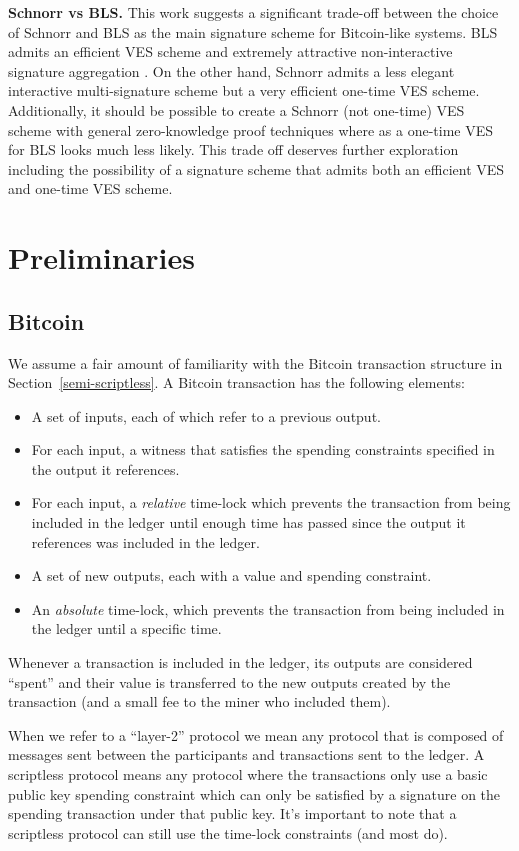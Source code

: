 \documentclass[fullpage]{article}
\theoremstyle{definition}
\begin{document}
\hfill \break \textbf{Schnorr vs BLS.} This work suggests a significant trade-off between the choice of Schnorr and BLS as the main signature scheme for Bitcoin-like systems. BLS admits an efficient VES scheme\cite{Boneh:2003:AVE:1766171.1766207} and extremely attractive non-interactive signature aggregation \cite{compact-blockchains-bls}. On the other hand, Schnorr admits a less elegant interactive multi-signature scheme\cite{musig} but a very efficient one-time VES scheme. Additionally, it should be possible to create a Schnorr (not one-time) VES scheme with general zero-knowledge proof techniques where as a one-time VES for BLS looks much less likely. This trade off deserves further exploration including  the possibility of a signature scheme that admits both an efficient VES and one-time VES scheme.

\section{Preliminaries}

\subsection{Bitcoin}
We assume a fair amount of familiarity with the Bitcoin transaction structure in Section~\ref{semi-scriptless}. A Bitcoin transaction has the following elements:
\begin{itemize}
    \item A set of inputs, each of which refer to a previous output.
    \item For each input, a witness that satisfies the spending constraints specified in the output it references.
    \item For each input, a \emph{relative} time-lock which prevents the transaction from being included in the ledger until enough time has passed since the output it references was included in the ledger.
    \item A set of new outputs, each with a value and spending constraint.
    \item An \emph{absolute} time-lock, which prevents the transaction from being included in the ledger until a specific time.
\end{itemize}
Whenever a transaction is included in the ledger, its outputs are considered ``spent'' and their value is transferred to the new outputs created by the transaction (and a small fee to the miner who included them).

When we refer to a ``layer-2'' protocol we mean any protocol that is composed of messages sent between the participants and transactions sent to the ledger. A scriptless protocol means any protocol where the transactions only use a basic public key spending constraint which can only be satisfied by a signature on the spending transaction under that public key. It's important to note that a scriptless protocol can still use the time-lock constraints (and most do).
\end{document}
